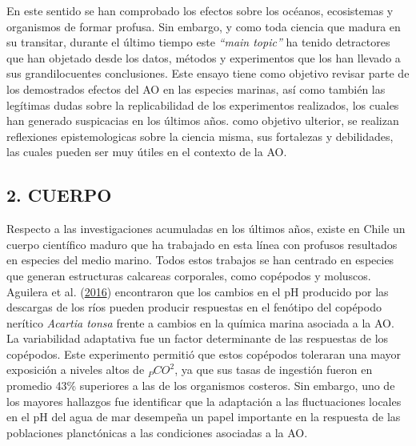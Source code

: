 \documentclass[
]{article}
\begin{document}
En este sentido se han comprobado los efectos sobre los océanos,
ecosistemas y organismos de formar profusa. Sin embargo, y como toda
ciencia que madura en su transitar, durante el último tiempo este
\emph{``main topic''} ha tenido detractores que han objetado desde los
datos, métodos y experimentos que los han llevado a sus grandilocuentes
conclusiones. Este ensayo tiene como objetivo revisar parte de los
demostrados efectos del AO en las especies marinas, así como también las
legítimas dudas sobre la replicabilidad de los experimentos realizados,
los cuales han generado suspicacias en los últimos años. como objetivo
ulterior, se realizan reflexiones epistemologicas sobre la ciencia
misma, sus fortalezas y debilidades, las cuales pueden ser muy útiles en
el contexto de la AO.

\pagebreak

\hypertarget{cuerpo}{%
\subsection{2. CUERPO}\label{cuerpo}}

Respecto a las investigaciones acumuladas en los últimos años, existe en
Chile un cuerpo científico maduro que ha trabajado en esta línea con
profusos resultados en especies del medio marino. Todos estos trabajos
se han centrado en especies que generan estructuras calcareas
corporales, como copépodos y moluscos. Aguilera et al.
(\protect\hyperlink{ref-Aguilera2016}{2016}) encontraron que los cambios
en el pH producido por las descargas de los ríos pueden producir
respuestas en el fenótipo del copépodo nerítico \emph{Acartia tonsa}
frente a cambios en la química marina asociada a la AO. La variabilidad
adaptativa fue un factor determinante de las respuestas de los
copépodos. Este experimento permitió que estos copépodos toleraran una
mayor exposición a niveles altos de \(_PCO^2\), ya que sus tasas de
ingestión fueron en promedio 43\% superiores a las de los organismos
costeros. Sin embargo, uno de los mayores hallazgos fue identificar que
la adaptación a las fluctuaciones locales en el pH del agua de mar
desempeña un papel importante en la respuesta de las poblaciones
planctónicas a las condiciones asociadas a la AO.
\end{document}
